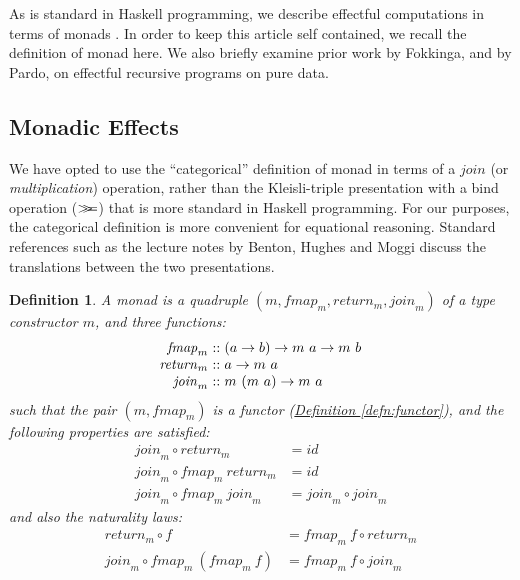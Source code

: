 \documentclass{jfp1}
\newcommand{\mbind}{\mathrel{>\kern-0.45em>\kern-0.45em=}}
\newtheorem{definition}{Definition}
\newcommand{\defref}[1]{\hyperref[#1]{Definition \ref*{#1}}}
\begin{document}
As is standard in Haskell programming, we describe effectful
computations in terms of monads \cite{moggi91notions,
  peytonjones93imperative}. In order to keep this article self
contained, we recall the definition of monad here. We also briefly
examine prior work by Fokkinga, and by Pardo, on effectful recursive
programs on pure data.

\subsection{Monadic Effects}

We have opted to use the ``categorical'' definition of monad in terms
of a $\mathit{join}$ (or \emph{multiplication}) operation, rather than the
Kleisli-triple presentation with a bind operation ($\mbind$) that is
more standard in Haskell programming. For our purposes, the
categorical definition is more convenient for equational
reasoning. Standard references such as the lecture notes by Benton,
Hughes and Moggi \cite{benton00monads} discuss the translations
between the two presentations.

\begin{definition}\label{defn:monad}
  A monad is a quadruple $(m, \mathit{fmap}_m, \mathit{return}_m,
  \mathit{join}_m)$ of a type constructor $m$, and three functions:
  \begin{displaymath}
    \begin{array}{r@{\hspace{0.3em}}c@{\hspace{0.3em}}l}
      \mathit{fmap}_m   & :: & (a \to b) \to m~a \to m~b \\
      \mathit{return}_m & :: & a \to m~a \\
      \mathit{join}_m   & :: & m~(m~a) \to m~a
    \end{array}
  \end{displaymath}
  such that the pair $(m, \mathit{fmap}_m)$ is a functor
  (\defref{defn:functor}), and the following properties are satisfied:
  \begin{align}
    \label{eq:monad-join-return}
    \mathit{join}_m \circ \mathit{return}_m & = \mathit{id} \\
    \label{eq:monad-join-fmap-return}
    \mathit{join}_m \circ \mathit{fmap}_m~\mathit{return}_m & = \mathit{id} \\
    \label{eq:monad-join-join}
    \mathit{join}_m \circ \mathit{fmap}_m~\mathit{join}_m & = \mathit{join}_m \circ \mathit{join}_m
  \end{align}
  and also the naturality laws:
  \begin{align}
    \label{eq:monad-return-natural}
    \mathit{return}_m \circ f & = \mathit{fmap}_m~f \circ \mathit{return}_m \\
    \label{eq:monad-join-natural}
    \mathit{join}_m \circ \mathit{fmap}_m~(\mathit{fmap}_m~f) & = \mathit{fmap}_m~f \circ \mathit{join}_m
  \end{align}
\end{definition}
\end{document}
